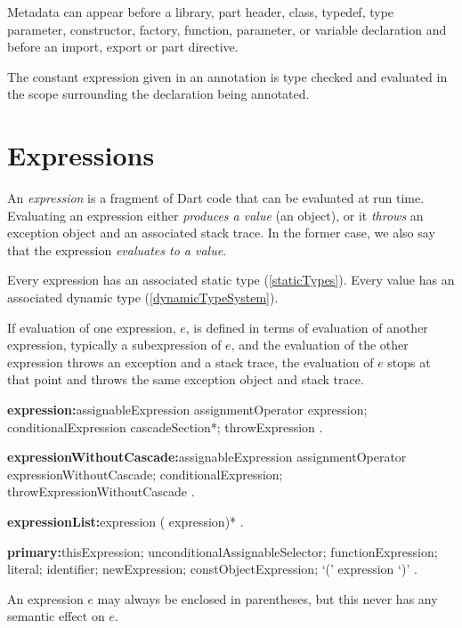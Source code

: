 \documentclass{article}
\begin{document}
\LMHash{}
Metadata can appear before a library, part header, class, typedef, type parameter, constructor, factory, function, parameter, or variable declaration and before an import, export or part directive.

\LMHash{}
The constant expression given in an annotation is type checked and evaluated in the scope surrounding the declaration being annotated.


\section{Expressions}

\LMHash{}
\label{evaluation}
An {\em expression} is a fragment of Dart code that can be evaluated at run time.
Evaluating an expression either {\em produces a value} (an object),
or it {\em throws} an exception object and an associated stack trace.
In the former case, we also say that the expression {\em evaluates to a value}.

\LMHash{}
Every expression has an associated static type (\ref{staticTypes}).
Every value has an associated dynamic type (\ref{dynamicTypeSystem}).

\LMHash{}
If evaluation of one expression, $e$, is defined in terms of evaluation of another expression, typically a subexpression of $e$,
and the evaluation of the other expression throws an exception and a stack trace,
the evaluation of $e$ stops at that point and throws the same exception object and stack trace.

\begin{grammar}
{\bf expression:}assignableExpression assignmentOperator expression;
  conditionalExpression cascadeSection*;
  throwExpression
  .

{\bf expressionWithoutCascade:}assignableExpression assignmentOperator
  \gnewline{} expressionWithoutCascade;
  conditionalExpression;
  throwExpressionWithoutCascade
  .

{\bf expressionList:}expression (\gcomma{} expression)*
  .
\end{grammar}

\begin{grammar}
{\bf primary:}thisExpression;
  \SUPER{} unconditionalAssignableSelector;
  functionExpression;
  literal;
  identifier;
  newExpression;
  constObjectExpression;
  `(' expression `)'
  .
\end{grammar}

\LMHash{}
An expression $e$ may always be enclosed in parentheses, but this never has any semantic effect on $e$.
\end{document}
